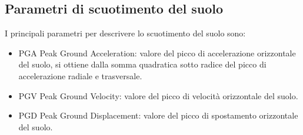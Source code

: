 \documentclass[a4paper,12pt,titlepage]{article}
\begin{document}
\subsection{Parametri di scuotimento del suolo}

I principali parametri per descrivere lo scuotimento del suolo sono:
\begin{itemize}
\item PGA Peak Ground Acceleration: valore del picco di accelerazione orizzontale del suolo, si ottiene dalla somma quadratica sotto radice del picco di accelerazione radiale e trasversale.
\item PGV Peak Ground Velocity: valore del picco di velocità orizzontale del suolo.
\item PGD Peak Ground Displacement: valore del picco di spostamento orizzontale del suolo.
\end{itemize}
\end{document}
